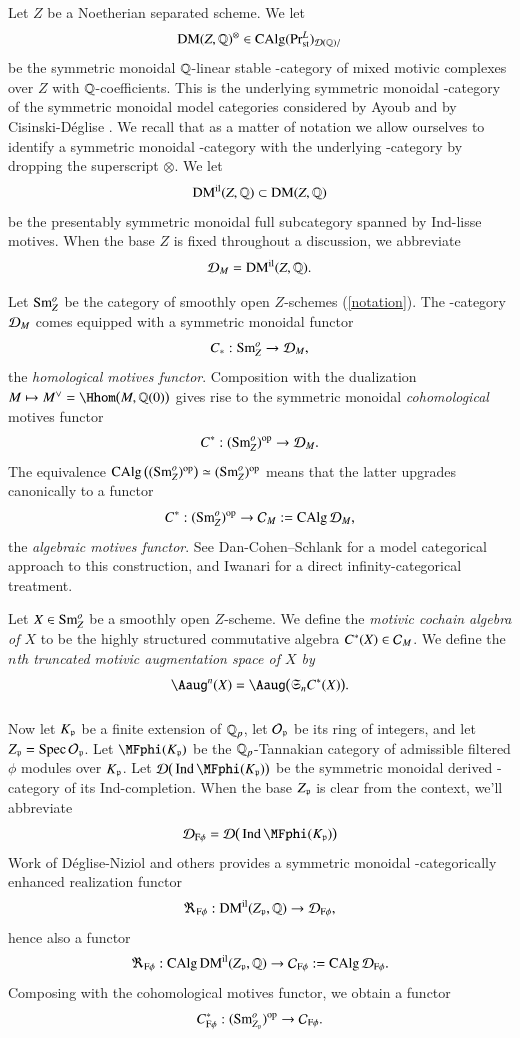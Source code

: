 \sspar{}
\label{EA23}
Let $Z$ be a Noetherian separated scheme. We let 
\[
\operatorname{DM}(Z, \mathbb{Q})^\otimes \in \operatorname{CAlg}(\mathrm{Pr}^L_{\mathrm{st}})_{\mathcal{D}(\mathbb{Q})/}
\]
be the symmetric monoidal  $\mathbb{Q}$-linear stable \oo-category of mixed motivic complexes over $Z$ with $\mathbb{Q}$-coefficients. This is the underlying symmetric monoidal \oo-category of the symmetric monoidal model categories considered by Ayoub \cite{AyoubSixI, AyoubSixII} and by Cisinski-D{\'e}glise \cite{CisDeg}. We recall that as a matter of notation we allow ourselves to identify a symmetric monoidal \oo-category with the underlying \oo-category by dropping the superscript $\otimes$. We let
\[
\operatorname{DM}^{\mathrm{il}}(Z, \mathbb{Q}) \subset \operatorname{DM}(Z, \mathbb{Q})
\]
be the presentably symmetric monoidal full subcategory spanned by Ind-lisse motives. When the base $Z$ is fixed throughout a discussion, we abbreviate 
\[
\mathcal{D}_M = \operatorname{DM}^{\mathrm{il}}(Z, \mathbb{Q}).
\]

\sspar{}
\label{EA24}
Let $\operatorname{Sm}^o_Z$ be the category of smoothly open $Z$-schemes (\ref{notation}). The \oo-category $\mathcal{D}_M$ comes equipped with a symmetric monoidal functor
\[
C_*: \operatorname{Sm}^o_Z \to \mathcal{D}_M,
\]
the \emph{homological motives functor}. Composition with the dualization $M \mapsto M^\lor = \Hhom\big(M, \QQ(0) \big)$ gives rise to the symmetric monoidal \emph{cohomological} motives functor 
\[
C^*: (\operatorname{Sm}_Z^o)^{\mathrm{op}} \to \mathcal{D}_M.
\]
The equivalence $\operatorname{CAlg} \big((\operatorname{Sm}_Z^o)^{\mathrm{op}}\big) \simeq (\operatorname{Sm}_Z^o)^{\mathrm{op}}$ means that the latter upgrades canonically to a functor 
\[
C^*: (\operatorname{Sm}_Z^o)^{\mathrm{op}} \to \mathcal{C}_M := \operatorname{CAlg} \mathcal{D}_M,
\]
the \emph{algebraic motives functor}. See Dan-Cohen--Schlank \cite{rmps_arXiv} for a model categorical approach to this construction, and Iwanari \cite{Iwanari} for a direct infinity-categorical treatment. 

\begin{ssDefinition}
\label{EA25}
Let $X \in \operatorname{Sm}^o_Z$ be a smoothly open $Z$-scheme. We define the \emph{motivic cochain algebra of $X$} to be the highly structured commutative algebra $C^*(X) \in \mathcal{C}_M$. We define the \emph{$n$th truncated motivic augmentation space of $X$ by}
\[
\Aaug^n(X) = \Aaug \big(\fkS_n C^*(X)\big).
\]
\end{ssDefinition}



\subsubsection{}
\label{EA26}
Now let $K_{\mathfrak{p}}$ be a finite extension of ${\mathbb{Q}_p}$, let $\mathcal{O}_{\mathfrak{p}}$ be its ring of integers, and let $Z_{\mathfrak{p}} = \operatorname{Spec} \mathcal{O}_{\mathfrak{p}}$. Let $\MFphi(K_\pP)$ be the ${\mathbb{Q}_p}$-Tannakian category of admissible filtered $\phi$ modules over $K_{\mathfrak{p}}$. Let $\Dd\big(\Ind \MFphi(K_\pP)\big)$ be the symmetric monoidal derived \oo-category of its Ind-completion. When the base $Z_{\mathfrak{p}}$ is clear from the context, we'll abbreviate
\[
\Dd_\Fphi = \Dd\big(\Ind \MFphi(K_\pP)\big)
\]
Work of Déglise-Niziol \cite{DegliseNiziol} and others provides a symmetric monoidal \oo-categorically enhanced realization functor
\[
\Re_{\mathrm{F}\phi}: \operatorname{DM}^{\mathrm{il}}(Z_{\mathfrak{p}}, \mathbb{Q}) \to 
\mathcal{D}_{\mathrm{F}\phi},
\]
hence also a functor 
\[
\Re_{\mathrm{F}\phi}: \operatorname{CAlg}
\operatorname{DM}^{\mathrm{il}}(Z_{\mathfrak{p}}, \mathbb{Q}) \to 
\mathcal{C}_{\mathrm{F}\phi} := \operatorname{CAlg} \mathcal{D}_{\mathrm{F}\phi}.
\]
Composing with the cohomological motives functor, we obtain a functor
\[
C^*_{\mathrm{F}\phi}: (\operatorname{Sm}^o_{Z_{\mathfrak{p}}})^{\mathrm{op}}  \to 
\mathcal{C}_{\mathrm{F}\phi}.
\]

